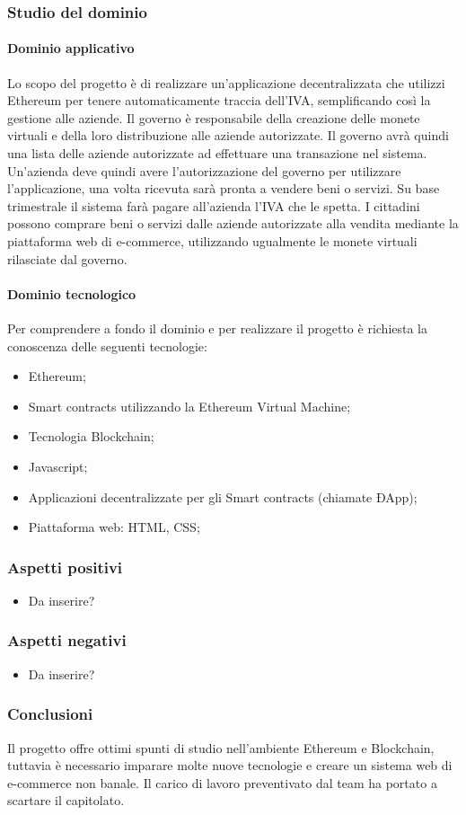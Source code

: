 		\subsubsection{Studio del dominio}
			\paragraph{Dominio applicativo} 
			Lo scopo del progetto è di realizzare un’applicazione decentralizzata che utilizzi Ethereum per tenere automaticamente traccia dell’IVA, semplificando così la gestione alle aziende.
Il governo è responsabile della creazione delle monete virtuali e della loro distribuzione alle aziende autorizzate. Il governo avrà quindi una lista delle aziende autorizzate ad effettuare una transazione nel sistema.
Un’azienda deve quindi avere l’autorizzazione del governo per utilizzare l’applicazione, una volta ricevuta sarà pronta a vendere beni o servizi. Su base trimestrale il sistema farà pagare all’azienda l’IVA che le spetta.
I cittadini possono comprare beni o servizi dalle aziende autorizzate alla vendita mediante la piattaforma web di e-commerce, utilizzando ugualmente le monete virtuali rilasciate dal governo.
			\paragraph{Dominio tecnologico}
			Per comprendere a fondo il dominio e per realizzare il progetto è richiesta la conoscenza delle seguenti tecnologie:
			\begin{itemize}
				\item Ethereum;
				\item Smart contracts utilizzando la Ethereum Virtual Machine;
				\item Tecnologia Blockchain;
				\item Javascript;
				\item Applicazioni decentralizzate per gli Smart contracts (chiamate ÐApp);
				\item Piattaforma web: HTML, CSS;
			\end{itemize}
		\subsubsection{Aspetti positivi}
		\begin{itemize}
			\item Da inserire?
		\end{itemize}
		\subsubsection{Aspetti negativi}
		\begin{itemize}
			\item Da inserire?
		\end{itemize}
		\subsubsection{Conclusioni}
		Il progetto offre ottimi spunti di studio nell’ambiente Ethereum e Blockchain, tuttavia è necessario imparare molte nuove tecnologie e creare un sistema web di e-commerce non banale. Il carico di lavoro preventivato dal team ha portato a scartare il capitolato.